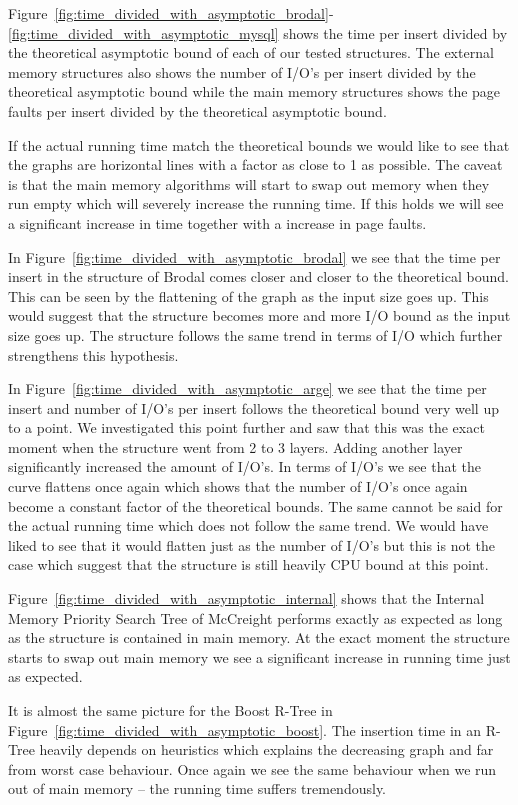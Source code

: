 \documentclass[twoside,11pt,openright]{report}
\begin{document}
Figure~\ref{fig:time_divided_with_asymptotic_brodal}-\ref{fig:time_divided_with_asymptotic_mysql} shows the time per insert divided by the theoretical asymptotic bound of each of our tested structures. The external memory structures also shows the number of I/O's per insert divided by the theoretical asymptotic bound while the main memory structures shows the page faults per insert divided by the theoretical asymptotic bound. 

If the actual running time match the theoretical bounds we would like to see that the graphs are horizontal lines with a factor as close to 1 as possible. The caveat is that the main memory algorithms will start to swap out memory when they run empty which will severely increase the running time. If this holds we will see a significant increase in time together with a increase in page faults.

In Figure~\ref{fig:time_divided_with_asymptotic_brodal} we see that the time per insert in the structure of Brodal comes closer and closer to the theoretical bound. This can be seen by the flattening of the graph as the input size goes up. This would suggest that the structure becomes more and more I/O bound as the input size goes up. The structure follows the same trend in terms of I/O which further strengthens this hypothesis.

In Figure~\ref{fig:time_divided_with_asymptotic_arge} we see that the time per insert and number of I/O's per insert follows the theoretical bound very well up to a point. We investigated this point further and saw that this was the exact moment when the structure went from 2 to 3 layers. Adding another layer significantly increased the amount of I/O's. In terms of I/O's we see that the curve flattens once again which shows that the number of I/O's once again become a constant factor of the theoretical bounds. The same cannot be said for the actual running time which does not follow the same trend. We would have liked to see that it would flatten just as the number of I/O's but this is not the case which suggest that the structure is still heavily CPU bound at this point.

Figure~\ref{fig:time_divided_with_asymptotic_internal} shows that the Internal Memory Priority Search Tree of McCreight performs exactly as expected as long as the structure is contained in main memory. At the exact moment the structure starts to swap out main memory we see a significant increase in running time just as expected.

It is almost the same picture for the Boost R-Tree in Figure~\ref{fig:time_divided_with_asymptotic_boost}. The insertion time in an R-Tree heavily depends on heuristics which explains the decreasing graph and far from worst case behaviour. Once again we see the same behaviour when we run out of main memory -- the running time suffers tremendously.
\end{document}
